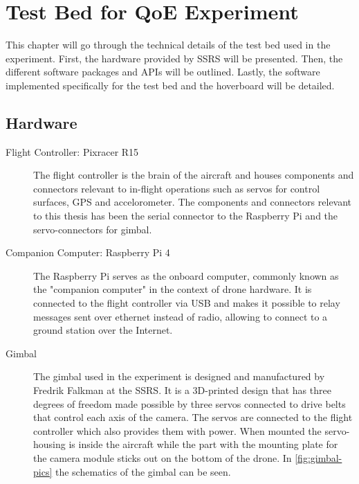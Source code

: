 \documentclass[nofilelist]{cslthse-msc}
\begin{document}
\chapter{Test Bed for QoE Experiment}
This chapter will go through the technical details of the test bed used in the experiment. First, the hardware provided by SSRS will be presented. Then, the different software packages and APIs will be outlined. Lastly, the software implemented specifically for the test bed and the hoverboard will be detailed.

\section{Hardware}
\begin{description}
   \item[Flight Controller: Pixracer R15] The flight controller is the brain of the aircraft and houses components and connectors relevant to in-flight operations such as servos for control surfaces, GPS and accelorometer. The components and connectors relevant to this thesis has been the serial connector to the Raspberry Pi and the servo-connectors for gimbal.

   \item[Companion Computer: Raspberry Pi 4] The Raspberry Pi serves as the onboard computer, commonly known as the "companion computer" in the context of drone hardware. It is connected to the flight controller via USB and makes it possible to relay messages sent over ethernet instead of radio, allowing to connect to a ground station over the Internet. 

   \item[Gimbal] The gimbal used in the experiment is designed and manufactured by Fredrik Falkman at the SSRS. It is a 3D-printed design that has three degrees of freedom made possible by three servos connected to drive belts that control each axis of the camera. The servos are connected to the flight controller which also provides them with power. When mounted the servo-housing is inside the aircraft while the part with the mounting plate for the camera module sticks out on the bottom of the drone. In \ref{fig:gimbal-pics} the schematics of the gimbal can be seen. 
   

\end{description}
\end{document}

